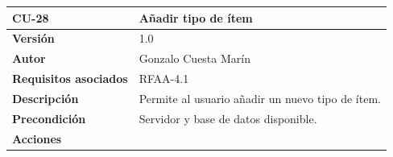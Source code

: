 \documentclass[
]{article}
\begin{document}
\begin{longtable}[]{@{}ll@{}}
\toprule
\begin{minipage}[b]{0.21\columnwidth}\raggedright
\textbf{CU-28}\strut
\end{minipage} & \begin{minipage}[b]{0.73\columnwidth}\raggedright
\textbf{Añadir tipo de ítem}\strut
\end{minipage}\tabularnewline
\midrule
\endhead
\begin{minipage}[t]{0.21\columnwidth}\raggedright
\textbf{Versión}\strut
\end{minipage} & \begin{minipage}[t]{0.73\columnwidth}\raggedright
1.0\strut
\end{minipage}\tabularnewline
\begin{minipage}[t]{0.21\columnwidth}\raggedright
\textbf{Autor}\strut
\end{minipage} & \begin{minipage}[t]{0.73\columnwidth}\raggedright
Gonzalo Cuesta Marín\strut
\end{minipage}\tabularnewline
\begin{minipage}[t]{0.21\columnwidth}\raggedright
\textbf{Requisitos asociados}\strut
\end{minipage} & \begin{minipage}[t]{0.73\columnwidth}\raggedright
RFAA-4.1\strut
\end{minipage}\tabularnewline
\begin{minipage}[t]{0.21\columnwidth}\raggedright
\textbf{Descripción}\strut
\end{minipage} & \begin{minipage}[t]{0.73\columnwidth}\raggedright
Permite al usuario añadir un nuevo tipo de ítem.\strut
\end{minipage}\tabularnewline
\begin{minipage}[t]{0.21\columnwidth}\raggedright
\textbf{Precondición}\strut
\end{minipage} & \begin{minipage}[t]{0.73\columnwidth}\raggedright
Servidor y base de datos disponible.\strut
\end{minipage}\tabularnewline
\begin{minipage}[t]{0.21\columnwidth}\raggedright
\textbf{Acciones}\strut
\end{minipage} & \begin{minipage}[t]{0.73\columnwidth}\raggedright
\begin{enumerate}
\def\labelenumi{\arabic{enumi}.}

\end{enumerate}
\end{minipage}
\end{longtable}
\end{document}
